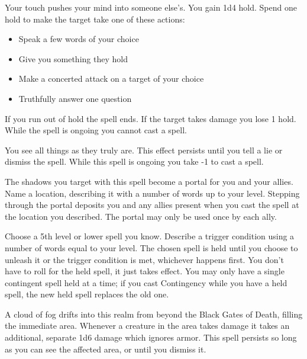 Your touch pushes your mind into someone else's. You gain 1d4 hold. Spend one hold to make the target take one of these actions:
\begin{itemize}
\item Speak a few words of your choice
\item Give you something they hold
\item Make a concerted attack on a target of your choice
\item Truthfully answer one question

\end{itemize}

If you run out of hold the spell ends. If the target takes damage you lose 1 hold. While the spell is ongoing you cannot cast a spell.



You see all things as they truly are. This effect persists until you tell a lie or dismiss the spell. While this spell is ongoing you take -1 to cast a spell.

\newpage
{}


The shadows you target with this spell become a portal for you and your allies. Name a location, describing it with a number of words up to your level. Stepping through the portal deposits you and any allies present when you cast the spell at the location you described. The portal may only be used once by each ally.



Choose a 5th level or lower spell you know. Describe a trigger condition using a number of words equal to your level. The chosen spell is held until you choose to unleash it or the trigger condition is met, whichever happens first. You don't have to roll for the held spell, it just takes effect. You may only have a single contingent spell held at a time; if you cast Contingency while you have a held spell, the new held spell replaces the old one.



A cloud of fog drifts into this realm from beyond the Black Gates of Death, filling the immediate area. Whenever a creature in the area takes damage it takes an additional, separate 1d6 damage which ignores armor. This spell persists so long as you can see the affected area, or until you dismiss it.

